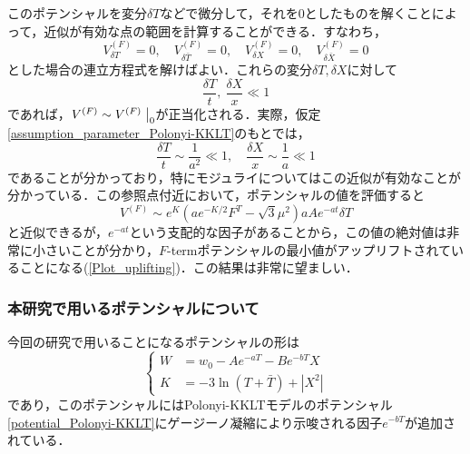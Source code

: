 \documentclass[a4paper,uplatex,dvipdfmx]{jsarticle}
\theoremstyle{definition}
\begin{document}
このポテンシャルを変分$\delta T$などで微分して，それを0としたものを解くことによって，近似が有効な点の範囲を計算することができる．すなわち，
\begin{equation}
   V^{(F)}_{\delta T}
   =
   0
   ,\quad
   V^{(F)}_{\delta \bar{T}}
   =
   0
   ,\quad
   V^{(F)}_{\delta X}
   =
   0
   ,\quad
   V^{(F)}_{\delta \bar{X}}
   =
   0
   \nonumber
\end{equation}
とした場合の連立方程式を解けばよい．これらの変分$\delta T,\delta X$に対して
\begin{equation}
   \frac{\delta T}{t}
   ,\ 
   \frac{\delta X}{x}
   \ll
   1
   \nonumber
\end{equation}
であれば，$V^{(F)}\sim V^{(F)}\left.\vphantom{\frac{1}{2}}\right|_{0}$が正当化される．実際，仮定\eqref{assumption_parameter_Polonyi-KKLT}のもとでは，
\begin{equation}
   \frac{\delta T}{t}
   \sim
   \frac{1}{a^2}
   \ll
   1
   ,\quad
   \frac{\delta X}{x}
   \sim
   \frac{1}{a}
   \ll
   1
   \nonumber
\end{equation}
であることが分かっており\cite{Abe_MoreFterm_2007a}，特にモジュライについてはこの近似が有効なことが分かっている．この参照点付近において，ポテンシャルの値を評価すると
\begin{equation}
   V^{(F)}
   \sim
   e^{K}
   (
      ae^{-K/2}F^{T}
      -
      \sqrt{3}\mu^2  
   )
   aAe^{-at}\delta T
   \nonumber
\end{equation}
と近似できるが，$e^{-at}$という支配的な因子があることから，この値の絶対値は非常に小さいことが分かり，$F$-termポテンシャルの最小値がアップリフトされていることになる(\ref{Plot_uplifting})．この結果は非常に望ましい．


\subsubsection{本研究で用いるポテンシャルについて}

今回の研究で用いることになるポテンシャルの形は
\begin{equation}
   \left\{
      \begin{alignedat}{1}
         W
         &=
         w_{0}
         -
         Ae^{-aT}
         -
         Be^{-bT}X
         \\
         K
         &=
         -
         3\ln(T+\bar{T})
         +
         |X^2|
      \end{alignedat}
   \right.
   \label{potential_now}
\end{equation}
であり，このポテンシャルにはPolonyi-KKLTモデルのポテンシャル\eqref{potential_Polonyi-KKLT}にゲージーノ凝縮により示唆される因子$e^{-bT}$が追加されている\cite{Dine_SupersymmetryString_2023}．
\end{document}
